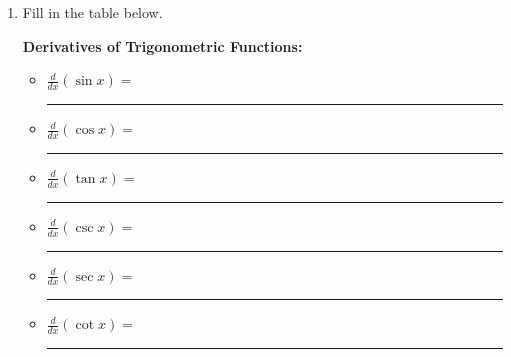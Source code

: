 \documentclass[11pt,fleqn]{article}
\begin{document}
\setlength{\parindent}{0cm}
\renewcommand{\headrulewidth}{0pt}
\newcommand{\blank}[1]{\rule{#1}{0.75pt}}
\renewcommand{\d}{\displaystyle}
\vspace*{-0.7in}
\begin{center}
 {\large{ }}
\end{center}
\begin{enumerate}

\item Fill in the table below. \\

\begin{framed}
  \textbf{Derivatives of Trigonometric Functions:}

\begin{multicols}{2}{
\vspace{-0.3in}
  \begin{itemize}
  \item $\frac{d}{dx} (\sin x) =$ \blank{0.85in}
  \item $\frac{d}{dx} (\cos x) = $ \blank{0.85in}
  \item $\frac{d}{dx} (\tan x) = $ \blank{0.85in}
\columnbreak
  \item $\frac{d}{dx} (\csc x) = $ \blank{0.85in}
  \item $\frac{d}{dx} (\sec x) = $ \blank{0.85in}
  \item $\frac{d}{dx} (\cot x) = $ \blank{0.85in}
  \end{itemize}}
\end{multicols}
\end{framed}


\end{enumerate}
\end{document}
